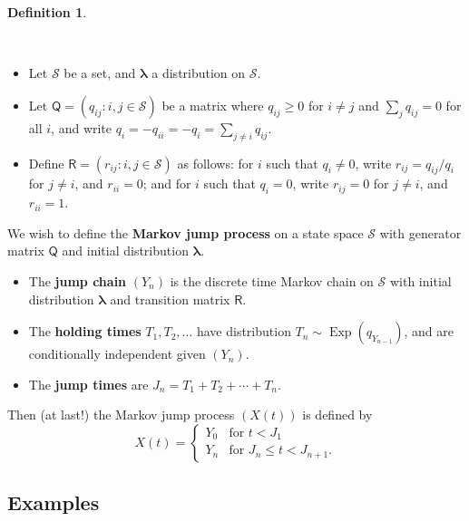 \documentclass[
  a4paper,
]{article}
\providecommand{\tightlist}{%
  \setlength{\itemsep}{0pt}\setlength{\parskip}{0pt}}
\theoremstyle{definition}
\newtheorem{definition}{Definition}[section]
\theoremstyle{definition}
\theoremstyle{definition}
\theoremstyle{remark}
\begin{document}
\begin{definition}
\protect\hypertarget{def:CTMC}{}\label{def:CTMC}

~

\begin{itemize}
\tightlist
\item
  Let \(\mathcal S\) be a set, and \(\boldsymbol\lambda\) a distribution on \(\mathcal S\).
\item
  Let \(\mathsf Q = (q_{ij} : i,j \in \mathcal S)\) be a matrix where \(q_{ij} \geq 0\) for \(i \neq j\) and \(\sum_j q_{ij} = 0\) for all \(i\), and write \(q_i = -q_{ii} = -q_i = \sum_{j \neq i} q_{ij}\).
\item
  Define \(\mathsf R = (r_{ij} : i,j \in \mathcal S)\) as follows: for \(i\) such that \(q_i \neq 0\), write \(r_{ij} = q_{ij}/q_i\) for \(j \neq i\), and \(r_{ii}= 0\); and for \(i\) such that \(q_i = 0\), write \(r_{ij} = 0\) for \(j \neq i\), and \(r_{ii} = 1\).
\end{itemize}

We wish to define the \textbf{Markov jump process} on a state space \(\mathcal S\) with generator matrix \(\mathsf Q\) and initial distribution \(\boldsymbol\lambda\).

\begin{itemize}
\tightlist
\item
  The \textbf{jump chain} \((Y_n)\) is the discrete time Markov chain on \(\mathcal S\) with initial distribution \(\boldsymbol\lambda\) and transition matrix \(\mathsf R\).
\item
  The \textbf{holding times} \(T_1, T_2, \dots\) have distribution \(T_n \sim \operatorname{Exp}(q_{Y_{n-1}})\), and are conditionally independent given \((Y_n)\).
\item
  The \textbf{jump times} are \(J_n = T_1 + T_2 + \cdots + T_n\).
\end{itemize}

Then (at last!) the Markov jump process \((X(t))\) is defined by
\[
    X(t) = \begin{cases} Y_0 & \text{for }t < J_1 \\
                         Y_n & \text{for }J_n \leq t < J_{n+1} .\end{cases}  \]

\end{definition}

\hypertarget{CTMC-examples}{%
\subsection{Examples}\label{CTMC-examples}}
\end{document}
